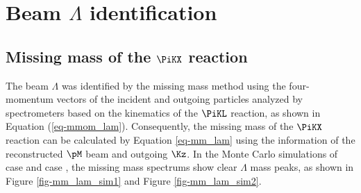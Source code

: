 \begin{comment}
\subsubsection{Path length of $\Kz$ projected onto the $z-$axis}
\label{sec-dzk0}
In the $\Kz$ event, ideally, the difference between the vertex position of the $\pM$ beam and $\Kz$ tracks, and the vertex position of the two outgoing $\pi$s' tracks should become larger depending on the path length of $\Kz$. In contrast, it must be zero in the non-strangeness multiple $\pi$ events. In other words, this vertex position difference corresponds to the $\Kz$ path length inside the LH$_2$ target. The $\Kz$ path length projected onto the $z-$axis, $\Delta z_{\Kz}$, can be calculated as 
\begin{align}
  \Delta z_{\Kz} &= z_{decay} - z_{prod}, \\
  		        &= z_{\pP,\ \pM} - z_{\pM\ beam,\ \Kz},
  \label{eq-dzk0}
\end{align}
where $z_{\pP,\ \pM}$ ($z_{decay}$) is the vertex position of the outgoing $\pP$ and $\pM$ tracks projected onto the $z-$axis, and $z_{\pM\ beam,\ \Kz}$ ($z_{prod}$) is the vertex position of the $\pM$ beam and reconstructed $\Kz$ tracks projected onto the $z-$axis. The Monte Carlo simulation indicates that it would distribute in the $-50 - 200$ mm range as shown in Figure \ref{fig-K0path_sim}, so the cut was chosen at the same region for E40 data as shown in Figure \ref{fig-K0path}. 
\end{comment}


\clearpage
\section{Beam $\Lambda$ identification}
\label{sec-beamLID}
\subsection{Missing mass of the $\PiKX$ reaction}
The beam $\Lambda$ was identified by the missing mass method using the four-momentum vectors of the incident and outgoing particles analyzed by spectrometers based on the kinematics of the $\PiKL$ reaction, as shown in Equation (\ref{eq-mmom_lam}). Consequently, the missing mass of the $\PiKX$ reaction can be calculated by Equation \ref{eq-mm_lam} using the information of the reconstructed $\pM$ beam and outgoing $\Kz$. In the Monte Carlo simulations of case  and case , the missing mass spectrums show clear $\Lambda$ mass peaks, as shown in Figure \ref{fig-mm_lam_sim1} and Figure \ref{fig-mm_lam_sim2}.

